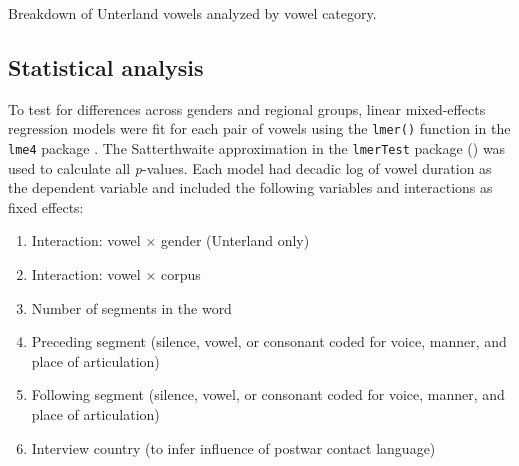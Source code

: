 \documentclass[output=paper,colorlinks,citecolor=brown]{langscibook}
\begin{document}
\begin{table}
\captionsetup{margin=.05\linewidth}
\begin{floatrow}
{\caption{\label{tab:nove:3} Breakdown of Unterland vowels analyzed by vowel category.}}
{\caption{\label{tab:nove:4} Breakdown of Central Poland vowels analyzed by vowel category.}}
\end{floatrow}
\end{table}

\subsection{Statistical analysis}
\label{sec:nove:4.2}

To test for differences across genders and regional groups, linear mixed-effects regression models were fit for each pair of vowels using the \texttt{lmer()} function in the \texttt{lme4} package \citep{BatesEtAl2013}. The Satterthwaite approximation in the \texttt{lmerTest} package (\citealt{KuznetsovaChristensen2017}) was used to calculate all \textit{p}-values. Each model had decadic log of vowel duration as the dependent variable and included the following variables and interactions as fixed effects:

\begin{enumerate}
\item  Interaction: vowel × gender (Unterland only)
\item  Interaction: vowel × corpus
\item  Number of segments in the word
\item  Preceding segment (silence, vowel, or consonant coded for voice, manner, and place of articulation)
\item  Following segment (silence, vowel, or consonant coded for voice, manner, and place of articulation)
\item  Interview country (to infer influence of postwar contact language)
\end{enumerate}
\end{document}
